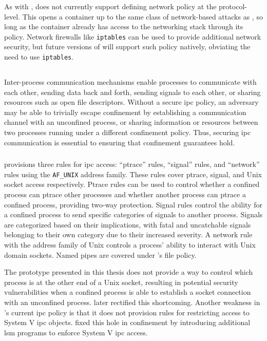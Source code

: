 As with \bpfbox{}, \bpfcontain{} does not currently support defining network policy at the
protocol-level. This opens a \bpfcontain{} container up to the same class of network-based
attacks as \bpfbox{}, so long as the container already has access to the networking stack
through its \bpfcontain{} policy. Network firewalls like \texttt{iptables} can be used to
provide additional network security, but future versions of \bpfcontain{} will support
such policy natively, obviating the need to use \texttt{iptables}.

\subsection{}

Inter-process communication mechanisms enable processes to communicate with each other,
sending data back and forth, sending signals to each other, or sharing resources such as
open file descriptors. Without a secure \gls{ipc} policy, an adversary may be able to
trivially escape confinement by establishing a communication channel with an unconfined
process, or sharing information or resources between two processes running under
a different confinement policy. Thus, securing \gls{ipc} communication is essential to
ensuring that confinement guarantees hold.

\subsubsection{\bpfbox{}}

\bpfbox{} provisions three rules for \gls{ipc} access: \enquote{ptrace} rules,
\enquote{signal} rules, and \enquote{network} rules using the \texttt{AF\_UNIX} address
family. These rules cover ptrace, signal, and Unix socket access respectively. Ptrace
rules can be used to control whether a confined process can ptrace other processes and
whether another process can ptrace a confined process, providing two-way protection.
Signal rules control the ability for a confined process to send specific categories of
signals to another process. Signals are categorized based on their implications, with
fatal and uncatchable signals belonging to their own category due to their increased
severity. A network rule with the address family of Unix controls a process' ability to interact
with Unix domain sockets. Named pipes are covered under \bpfbox{}'s file policy.

The \bpfbox{} prototype presented in this thesis does not provide a way to control which
process is at the other end of a Unix socket, resulting in potential security
vulnerabilities when a confined process is able to establish a socket connection with an
unconfined process. \bpfcontain{} later rectified this shortcoming.  Another weakness in
\bpfbox{}'s current \gls{ipc} policy is that it does not provision rules for restricting
access to System V \gls{ipc} objects. \bpfcontain{} fixed this hole in confinement by
introducing additional \gls{lsm} programs to enforce System V \gls{ipc} access.

